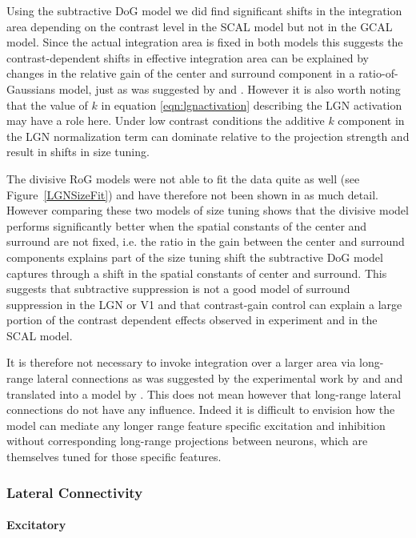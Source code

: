 Using the subtractive DoG model we did find significant shifts in the
integration area depending on the contrast level in the SCAL model but
not in the GCAL model. Since the actual integration area is fixed in
both models this suggests the contrast-dependent shifts in effective
integration area can be explained by changes in the relative gain of
the center and surround component in a ratio-of-Gaussians model, just
as was suggested by \cite{Cavanaugh2002} and
\citep{Solomon2006}. However it is also worth noting that the value of
$k$ in equation \ref{eqn:lgnactivation} describing the LGN activation
may have a role here. Under low contrast conditions the additive $k$
component in the LGN normalization term can dominate relative to the
projection strength and result in shifts in size tuning.

The divisive RoG models were not able to fit the data quite as well
(see Figure~\ref{LGNSizeFit}) and have therefore not been shown in as
much detail. However comparing these two models of size tuning shows
that the divisive model performs significantly better when the spatial
constants of the center and surround are not fixed, i.e. the ratio in
the gain between the center and surround components explains part of
the size tuning shift the subtractive DoG model captures through a
shift in the spatial constants of center and surround. This suggests
that subtractive suppression is not a good model of surround
suppression in the LGN or V1 and that contrast-gain control can
explain a large portion of the contrast dependent effects observed in
experiment and in the SCAL model.

It is therefore not necessary to invoke integration over a larger area
via long-range lateral connections as was suggested by the
experimental work by \cite{Levitt2002} and \cite{Sceniak2001} and
translated into a model by \cite{Schwabe2006}. This does not mean
however that long-range lateral connections do not have any
influence. Indeed it is difficult to envision how the model can
mediate any longer range feature specific excitation and inhibition
without corresponding long-range projections between neurons, which
are themselves tuned for those specific features.

\subsubsection*{Lateral Connectivity}

\paragraph{Excitatory}

